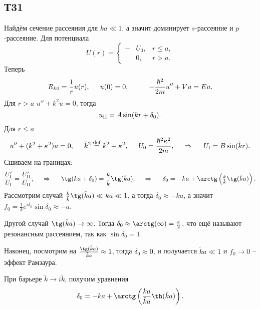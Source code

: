 \subsection*{Т31}

Найдём сечение рассеяния для $k a \ll 1$, а значит доминирует $s$-рассеяние и $p$-рассеяние. 
Для потенциала
\begin{equation*}
	U(r) = \left\{\begin{aligned}
	    -&U_0, &r \leq a, \\
	    &0,  &r>a.
	\end{aligned}\right.
\end{equation*}
Теперь
\begin{equation*}
	R_{k0} = \frac{1}{r} u(r),
	\hspace{5 mm} 
	u(0) = 0,
	\hspace{10 mm} 
	- \frac{\hbar^2}{2m} u'' + V u = E u.
\end{equation*}
Для $r > a$ $u'' + k^2 u = 0$, тогда
\begin{equation*}
	u_{\textnormal{II}} = A \sin(kr + \delta_0).
\end{equation*}
Для $r\leq a$ 
\begin{equation*}
	u'' + (k^2 + \kappa^2) u = 0,
	\hspace{5 mm} 
	\tilde{k}^2 \overset{\mathrm{def}}{=} k^2 + \kappa^2,
	\hspace{5 mm} 
	U_0 = \frac{\hbar^2 \kappa^2}{2m},
	\hspace{0.5cm} \Rightarrow \hspace{0.5cm}
	U_{\textnormal{I}} = B \sin(\tilde{k} r).
\end{equation*}
Сшиваем на границах:
\begin{equation*}
	\frac{\sub{U}{I}'}{\sub{U}{I}} = \frac{\sub{U}{II}'}{\sub{U}{II}},
	\hspace{0.5cm} \Rightarrow \hspace{0.5cm}
	\tg(ka + \delta_0) = \frac{k}{\tilde{k}} \tg(\tilde{k} a),
	\hspace{0.5cm} \Rightarrow \hspace{0.5cm}
	\delta_0 = - ka + \arctg\left(
		\tfrac{k}{\tilde{k}} \tg(\tilde{k} a)
	\right).
\end{equation*}
Рассмотрим случай $\frac{k}{\tilde{k}} \tg(\tilde{k} a) \ll ka \ll 1$, а тогда $\delta_0 \approx - ka$, а значит $f_0 = \frac{1}{k} e^{i \delta_0} \sin \delta_0 \approx - a$.


Другой случай $\tg(\tilde{k} a) \to \infty$. Тогда $\delta_0 \approx \arctg(\infty) = \frac{\pi}{2}$, что ещё называют резонансным рассеянием, так как $\sin \delta_0 = 1$.

Наконец, посмотрим на $\frac{\tg(\tilde{k} a)}{\tilde{k} a} \approx	1$, тогда $\delta_0 \approx	0$, и получается $\tilde{k} a \ll 1$ и $f_0 \to 0$ -- эффект Рамзаура.

При барьере $\tilde{k} \to i \tilde{k}$, получим уравнения
\begin{equation*}
	\delta_0 = - ka + \arctg\left(
		\frac{ka}{\tilde{k} a} \th(\tilde{k} a)
	\right).
\end{equation*}


